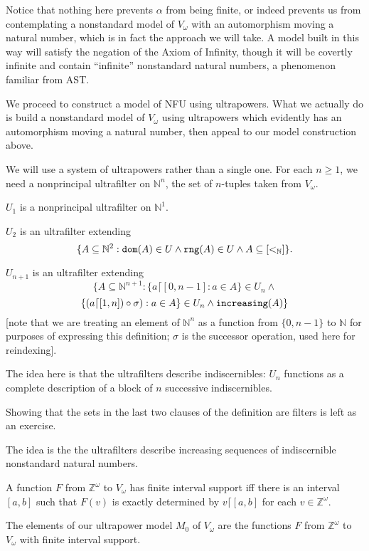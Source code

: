 \documentclass{slides}
\begin{document}
\begin{slide}

Notice that nothing here prevents $\alpha$ from being finite, or indeed prevents us from contemplating a nonstandard model of $V_\omega$ with an automorphism moving a natural number, which is in fact the approach we will take.  A model built in this way will satisfy the negation of the Axiom of Infinity, though it will be covertly infinite and contain ``infinite'' nonstandard natural numbers, a phenomenon familiar from AST.

\end{slide}

\begin{slide}

We proceed to construct a model of NFU using ultrapowers.  What we actually do is build a nonstandard model of $V_\omega$ using ultrapowers which evidently has an automorphism moving a natural number, then appeal to our model construction above.

We will use a system of ultrapowers rather than a single one.  For each $n\geq 1$, we need a nonprincipal ultrafilter
on $\mathbb N^n$, the set of $n$-tuples taken from $V_\omega$.

\end{slide}

\begin{slide}

$U_1$ is a nonprincipal ultrafilter on $\mathbb N^1$.

$U_2$ is an ultrafilter extending $$\{A \subseteq \mathbb N^2:{\tt dom}(A) \in U \wedge {\tt rng}(A) \in U \wedge A \subseteq [<_{\mathbb N}]\}.$$

$U_{n+1}$ is an ultrafilter extending $$\{A \subseteq \mathbb N^{n+1}: \{a\lceil [0,n-1]:a \in A\} \in U_n \wedge $$ $$ \{(a \lceil[1,n])\circ \sigma):a \in A\} \in U_n \wedge {\tt increasing}(A)\}$$ [note that we are treating an element of $\mathbb N^n$ as a function from $\{0,n-1\}$ to $\mathbb N$ for purposes of expressing this definition; $\sigma$ is the successor operation, used here for reindexing].

The idea here is that the ultrafilters describe indiscernibles: $U_n$ functions as a complete description of a block of $n$ successive indiscernibles.

\end{slide}

\begin{slide}

Showing that the sets in the last two clauses of the definition are filters is left as an exercise.

The idea is the the ultrafilters describe increasing sequences of indiscernible nonstandard natural numbers.

A function $F$ from $\mathbb Z^\omega$ to $V_\omega$ has finite interval support iff there is an interval
$[a,b]$ such that $F(v)$ is exactly determined by $v\lceil [a,b]$ for each $v \in \mathbb Z^\omega$.

The elements of our ultrapower model $M_0$ of $V_\omega$ are the functions $F$ from $\mathbb Z^\omega$ to $V_\omega$ with finite interval support.

\end{slide}
\end{document}
